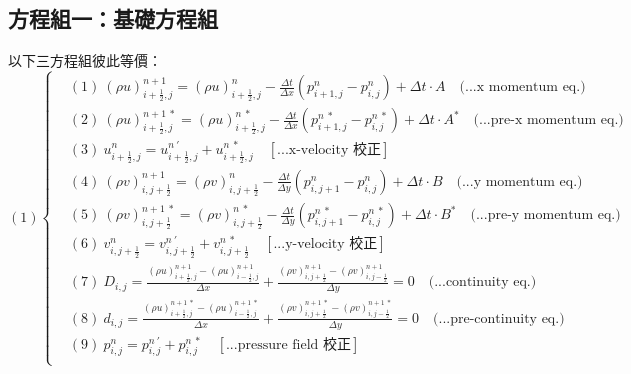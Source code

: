 \documentclass[12pt]{article}
\begin{document}
\subsection{方程組一：基礎方程組}
\label{sec:basic.s}
\noindent 以下三方程組彼此等價：\\
\begin{equation}
(1)
\left\{
\begin{aligned}
    &(1)\ (\rho u)_{i+\frac{1}{2},j}^{n+1} = (\rho u)_{i+\frac{1}{2},j}^{n} - \frac{\Delta t}{\Delta x}(p_{i+1,j}^{n} - p_{i,j}^{n}) + \Delta t \cdot A  \quad \text{(...x momentum eq.)}\\[1.5ex]
    &(2)\ (\rho u)_{i+\frac{1}{2},j}^{n+1\ *} = (\rho u)_{i+\frac{1}{2},j}^{n\ *} - \frac{\Delta t}{\Delta x}(p_{i+1,j}^{n\ *} - p_{i,j}^{n\ *}) + \Delta t \cdot A^{*}  \quad \text{(...pre-x momentum eq.)}\\[1.5ex]
    &(3)\ u_{i+\frac{1}{2},j}^{n} = u_{i+\frac{1}{2},j}^{n\ \prime} + u_{i+\frac{1}{2},j}^{n\ *}  \quad \left[\text{...x-velocity 校正}\right]\\[1.5ex]
    &(4)\ (\rho v)_{i,j+\frac{1}{2}}^{n+1} = (\rho v)_{i,j+\frac{1}{2}}^{n} - \frac{\Delta t}{\Delta y}(p_{i,j+1}^{n} - p_{i,j}^{n}) + \Delta t \cdot B  \quad \text{(...y momentum eq.)}\\[1.5ex]
    &(5)\ (\rho v)_{i,j+\frac{1}{2}}^{n+1\ *} = (\rho v)_{i,j+\frac{1}{2}}^{n\ *} - \frac{\Delta t}{\Delta y}(p_{i,j+1}^{n\ *} - p_{i,j}^{n\ *}) + \Delta t \cdot B^{*}  \quad \text{(...pre-y momentum eq.)}\\[1.5ex]
    &(6)\ v_{i,j+\frac{1}{2}}^{n} = v_{i,j+\frac{1}{2}}^{n\ \prime} + v_{i,j+\frac{1}{2}}^{n\ *} \quad \left[\text{...y-velocity 校正}\right]\\[1.5ex]
    &(7)\ D_{i,j} = \frac{(\rho u)_{i+\frac{1}{2},j}^{n+1} - (\rho u)_{i-\frac{1}{2},j}^{n+1}}{\Delta x} + \frac{(\rho v)_{i,j+\frac{1}{2}}^{n+1} - (\rho v)_{i,j-\frac{1}{2}}^{n+1}}{\Delta y} = 0 \quad \text{(...continuity eq.)}\\[1.5ex]
    &(8)\ d_{i,j} = \frac{(\rho u)_{i+\frac{1}{2},j}^{n+1\ *} - (\rho u)_{i-\frac{1}{2},j}^{n+1\ *}}{\Delta x} + \frac{(\rho v)_{i,j+\frac{1}{2}}^{n+1\ *} - (\rho v)_{i,j-\frac{1}{2}}^{n+1\ *}}{\Delta y} = 0 \quad \text{(...pre-continuity eq.)}\\[1.5ex]
    &(9)\ p_{i,j}^{n} = p_{i,j}^{n\ \prime} + p_{i,j}^{n\ *} \quad\left[\text{...pressure field 校正}\right]\\[1.5ex]
\end{aligned}
\right.
\end{equation}
\end{document}
